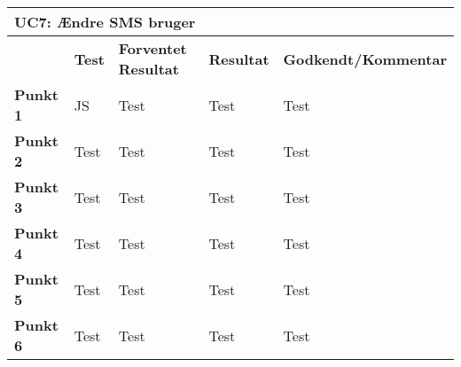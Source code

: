 \begin{table}[htbp] \centering
\begin{tabular}{|l|l|l|l|l|} %
	\hline
\multicolumn{5}{|l|}{\textbf{UC7: Ændre SMS bruger}} \\\hline
	&\textbf{Test} &\textbf{Forventet Resultat} &\textbf{Resultat} &\textbf{Godkendt/Kommentar} \\\hline
\textbf{Punkt 1}		&JS	&Test 	&Test	&Test \\\hline
\textbf{Punkt 2}		&Test	&Test 	&Test	&Test \\\hline
\textbf{Punkt 3}		&Test	&Test 	&Test	&Test \\\hline
\textbf{Punkt 4}		&Test	&Test 	&Test	&Test \\\hline
\textbf{Punkt 5}		&Test	&Test 	&Test	&Test \\\hline
\textbf{Punkt 6}		&Test	&Test 	&Test	&Test \\\hline
	\end{tabular}
	\label{ATUC7} 
\end{table}